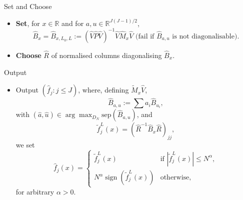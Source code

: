 \documentclass[10pt, aspectratio=169]{beamer}
\begin{document}
\begin{frame}
    \begin{mytheorembox}{Set and Choose}
        \begin{itemize}[label=\scalebox{0.5}{$\bullet$}]
    
        \item \textbf{Set}, for $x \in \mathbb{R}$ and for $a, u \in \mathbb{R}^{J(J-1)/2}$,
        \[
        \hat{B}_x = \hat{B}_{x, L_0, L} := (\hat{V} \hat{P} \hat{V})^{-1} \hat{V} \hat{M}_x \hat{V} \text{ (fail if } \hat{B}_{a, u} \text{ is not diagonalisable)}.
        \]
    
        \item \textbf{Choose} $\hat{R}$ of normalised columns diagonalising $\hat{B}_x$.
    \end{itemize}
        
    \end{mytheorembox}
\end{frame}


\begin{frame}
    \begin{mytheorembox}{Output}
    \begin{itemize}[label=\scalebox{0.5}{$\bullet$}]
        \item Output $(\hat{f}_j : j \leq J)$, where, defining $\tilde{M}_x \hat{V}$,
        \[
        \hat{B}_{a, u} := \sum a_i \hat{B}_{u_i},
        \]
        with $(\hat{a}, \hat{u}) \in \arg\max_{D_N} \text{sep}(\hat{B}_{a, u})$, and
        \[
        \tilde{f}^L_j(x) = (\hat{R}^{-1} \hat{B}_x \hat{R})_{jj},
        \]
        we set
        \[
        \hat{f}_j(x) =
        \begin{cases}
        \tilde{f}^L_j(x) & \text{if } |\tilde{f}^L_j(x)| \leq N^\alpha, \\
        N^\alpha \operatorname{sign}(\tilde{f}^L_j(x)) & \text{otherwise},
        \end{cases}
        \]
        for arbitrary $\alpha > 0$.
    \end{itemize}
        
    \end{mytheorembox}
\end{frame}


\begin{frame}

\end{frame}


\begin{frame}

\end{frame}

\begin{frame}

\end{frame}


\begin{frame}

\end{frame}


\begin{frame}

\end{frame}
\end{document}
